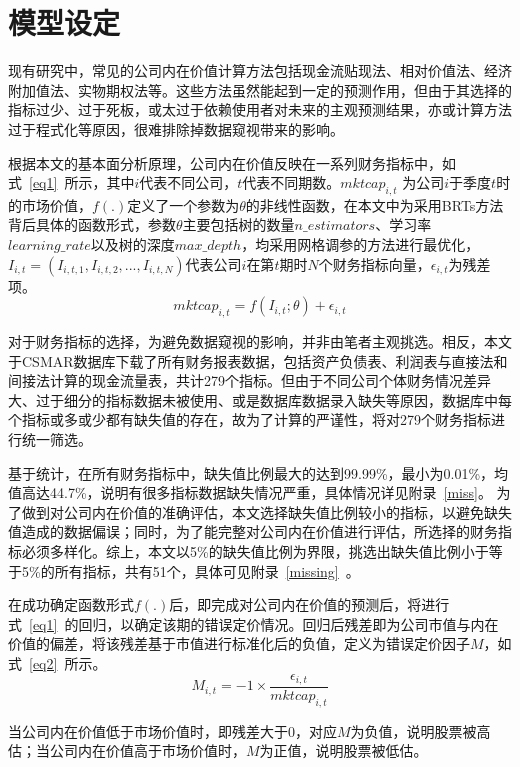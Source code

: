 \section{模型设定}
现有研究中，常见的公司内在价值计算方法包括现金流贴现法、相对价值法、经济附加值法、实物期权法等。这些方法虽然能起到一定的预测作用，但由于其选择的指标过少、过于死板，或太过于依赖使用者对未来的主观预测结果，亦或计算方法过于程式化等原因，很难排除掉数据窥视带来的影响。

根据本文的基本面分析原理，公司内在价值反映在一系列财务指标中，如式~\ref{eq1}~所示，其中$i$代表不同公司，$t$代表不同期数。$mktcap_{i, t}$ 为公司$i$于季度$t$时的市场价值，$f(.)$定义了一个参数为$\theta$的非线性函数，在本文中为采用BRTs方法背后具体的函数形式，参数$\theta$主要包括树的数量$n\_estimators$、学习率$learning\_rate$以及树的深度$max\_depth$，均采用网格调参的方法进行最优化，$ I_{i, t}=( I_{i, t,1},I_{i, t,2},...,I_{i, t,N})$代表公司$i$在第$t$期时$N$个财务指标向量，$\epsilon_{i, t}$为残差项。
\begin{equation}
\label{eq1}
mktcap_{i, t} =f(I_{i, t};\theta)+\epsilon_{i, t} 
\end{equation}

对于财务指标的选择，为避免数据窥视的影响，并非由笔者主观挑选。相反，本文于CSMAR数据库下载了所有财务报表数据，包括资产负债表、利润表与直接法和间接法计算的现金流量表，共计279个指标。但由于不同公司个体财务情况差异大、过于细分的指标数据未被使用、或是数据库数据录入缺失等原因，数据库中每个指标或多或少都有缺失值的存在，故为了计算的严谨性，将对279个财务指标进行统一筛选。

基于统计，在所有财务指标中，缺失值比例最大的达到99.99\%，最小为0.01\%，均值高达44.7\%，说明有很多指标数据缺失情况严重，具体情况详见附录~\ref{miss}。
为了做到对公司内在价值的准确评估，本文选择缺失值比例较小的指标，以避免缺失值造成的数据偏误\cite{yanFundamentalAnalysisCrossSection2017a}；同时，为了能完整对公司内在价值进行评估，所选择的财务指标必须多样化。综上，本文以5\%的缺失值比例为界限，挑选出缺失值比例小于等于5\%的所有指标，共有51个，具体可见附录~\ref{missing}~。

在成功确定函数形式$f(.)$后，即完成对公司内在价值的预测后，将进行式~\ref{eq1}~的回归，以确定该期的错误定价情况。回归后残差即为公司市值与内在价值的偏差，将该残差基于市值进行标准化后的负值，定义为错误定价因子$M$，如式~\ref{eq2}~所示。
\begin{equation}
\label{eq2}
M_{i, t} =-1 \times \frac{\epsilon_{i, t}}{mktcap_{i, t}}
\end{equation}

当公司内在价值低于市场价值时，即残差大于0，对应$M$为负值，说明股票被高估；当公司内在价值高于市场价值时，$M$为正值，说明股票被低估。

